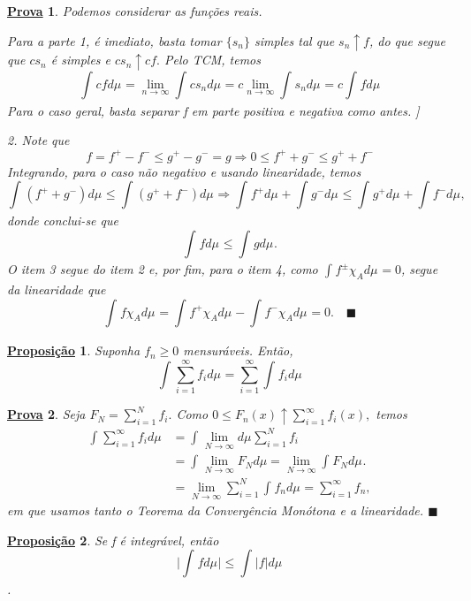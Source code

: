 \documentclass{article}
\newtheorem*{prop*}{\underline{Proposi\c c\~ao}}
\newtheorem*{proof*}{\underline{Prova}}
\renewcommand\qedsymbol{$\blacksquare$}
\begin{document}
\begin{proof*}
  Podemos considerar as funções reais. 

  Para a parte 1, é imediato, basta tomar \(\{s_{n}\}\) simples tal que \(s_{n}\uparrow f\), do que segue que \(cs_{n}\) é simples e \(cs_{n}\uparrow cf.\)
Pelo TCM, temos 
  \[
    \int_{}cf d\mu_{} = \lim_{n\to \infty}\int_{}cs_{n} d\mu_{} = c \lim_{n\to \infty}\int_{}s_{n} d\mu_{} = c \int_{}f d\mu_{}
  \]
  Para o caso geral, basta separar f em parte positiva e negativa como antes. ]

  2. Note que 
    \[
      f = f^{+} - f^{-} \leq g^{+} - g^{-} = g \Rightarrow  0 \leq f^{+} + g^{-} \leq g^{+} + f^{-}
    \]
  Integrando, para o caso não negativo e usando linearidade, temos 
    \[
      \int_{}(f^{+} + g^{-}) d\mu_{} \leq \int_{}(g^{+}+f^{-}) d\mu_{} \Rightarrow \int_{}f^{+} d\mu_{} + \int_{}g^{-} d\mu_{} \leq \int_{}g^{+} d\mu_{} + \int_{} f^{-} d\mu_{},
    \]
  donde conclui-se que 
    \[
      \int_{}f d\mu_{} \leq \int_{}g d\mu_{}.
    \]
  O item 3 segue do item 2 e, por fim, para o item 4, como \(\int_{}f^{\pm}\chi_{A} d\mu_{} = 0\), segue da linearidade que 
    \[
      \int_{}f \chi_{A} d\mu_{} = \int_{}f^{+}\chi_{A} d\mu_{} - \int_{}f^{-}\chi_{A} d\mu_{} = 0. \quad \text{\qedsymbol}
    \]
\end{proof*}
\begin{prop*}
  Suponha \(f_{n}\geq 0\) mensuráveis. Então, 
    \[
      \int_{}\sum\limits_{i=1}^{\infty}f_{i} d\mu_{} = \sum\limits_{i=1}^{\infty}\int_{}f_{i} d\mu_{}
    \]
\end{prop*}
\begin{proof*}
  Seja \(F_{N} = \sum\limits_{i=1}^{N}f_{i}.\) Como \(0 \leq F_{n}(x)\uparrow \sum\limits_{i=1}^{\infty}f_{i}(x),\) temos 
 \begin{align*}
   \int_{}\sum\limits_{i=1}^{\infty}f_{i} d\mu_{} &= \int_{}\lim_{N\to \infty} d\mu_{} \sum\limits_{i=1}^{N}f_{i} \\ 
                                                  &= \int_{}^{}\lim_{N\to \infty}F_{N}d\mu  = \lim_{N\to \infty}\int_{}F_{N} d\mu_{}.\\ 
                                                  &= \lim_{N\to \infty}\sum\limits_{i=1}^{N}\int_{}f_{n} d\mu_{} = \sum\limits_{i=1}^{\infty}f_{n},
 \end{align*}
em que usamos tanto o Teorema da Convergência Monótona e a linearidade. \qedsymbol
\end{proof*}
\begin{prop*}
  Se f é integrável, então 
    \[
      \biggl\vert \int_{}f d\mu_{} \biggr\vert \leq \int_{}|f| d\mu_{}
    \].
\end{prop*}
\end{document}
